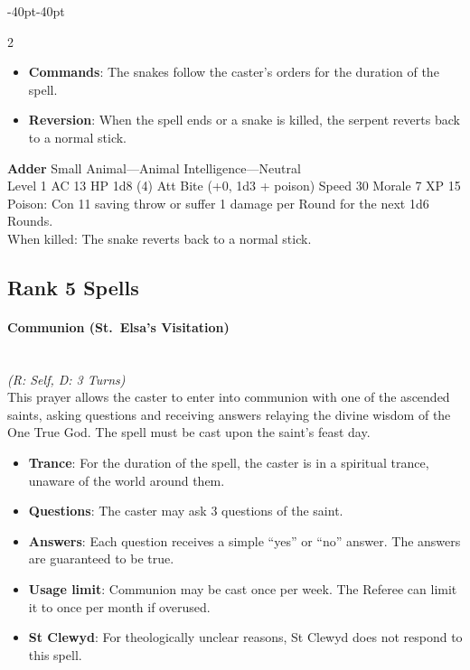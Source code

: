 \documentclass{book}
\providecommand{\tightlist}{%
\setlength{\itemsep}{0pt}\setlength{\parskip}{0pt}}
\begin{document}
\begin{adjustwidth}{-40pt}{-40pt}
\begin{multicols}{2}
\begin{itemize}
	\tightlist
	\item
	\textbf{Commands}: The snakes follow the caster's orders for the
	duration of the spell.
	\item
	\textbf{Reversion}: When the spell ends or a snake is killed, the
	serpent reverts back to a normal stick.
\end{itemize}

\textbf{Adder} Small Animal---Animal Intelligence---Neutral\\
Level 1 AC 13 HP 1d8 (4) Att Bite (+0, 1d3 + poison) Speed 30 Morale 7
XP 15\\
Poison: Con 11 saving throw or suffer 1 damage per Round for the next
1d6 Rounds.\\
When killed: The snake reverts back to a normal stick.

\subsection*{Rank 5 Spells}\label{rank-5-holy}

\paragraph{Communion (St.~Elsa's
	Visitation)}\label{communion-st.-elsas-visitation}\mbox{}\\
\emph{(R: Self, D: 3 Turns)}\\
This prayer allows the caster to enter into communion with one of the
ascended saints, asking questions and receiving answers relaying the
divine wisdom of the One True God. The spell must be cast upon the
saint's feast day.

\begin{itemize}
	\tightlist
	\item
	\textbf{Trance}: For the duration of the spell, the caster is in a
	spiritual trance, unaware of the world around them.
	\item
	\textbf{Questions}: The caster may ask 3 questions of the saint.
	\item
	\textbf{Answers}: Each question receives a simple ``yes'' or ``no''
	answer. The answers are guaranteed to be true.
	\item
	\textbf{Usage limit}: Communion may be cast once per week. The Referee
	can limit it to once per month if overused.
	\item
	\textbf{St Clewyd}: For theologically unclear reasons, St Clewyd does
	not respond to this spell.
\end{itemize}


\end{multicols}
\end{adjustwidth}
\end{document}
